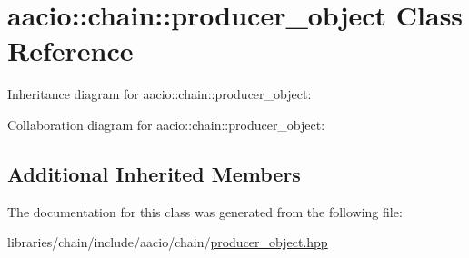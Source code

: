 \hypertarget{classaacio_1_1chain_1_1producer__object}{}\section{aacio\+:\+:chain\+:\+:producer\+\_\+object Class Reference}
\label{classaacio_1_1chain_1_1producer__object}


Inheritance diagram for aacio\+:\+:chain\+:\+:producer\+\_\+object\+:


Collaboration diagram for aacio\+:\+:chain\+:\+:producer\+\_\+object\+:
\subsection*{Additional Inherited Members}


The documentation for this class was generated from the following file\+:\begin{DoxyCompactItemize}
\item 
libraries/chain/include/aacio/chain/\mbox{\hyperlink{producer__object_8hpp}{producer\+\_\+object.\+hpp}}\end{DoxyCompactItemize}
